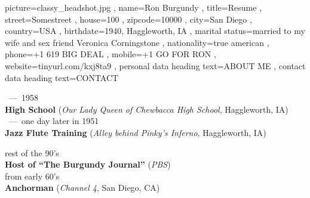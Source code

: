 \documentclass[a4paper, 12pt]{classycv}
\begin{document}
\begin{Resume}{%
	picture={classy_headshot.jpg}%
	, name={Ron Burgundy}%
	, title={Resume}%
	, street=Somestreet%
	, house=100%
	, zipcode=10000%
	, city=San Diego%
	, country=USA%
	, birthdate={1940, Haggleworth, IA}%
	, marital status={married to my wife and sex friend Veronica Corningstone}%
	, nationality=true american%
	, phone=+1 619 BIG DEAL%
	, mobile=+1 GO FOR RON%
	, website=tiny\-url.\-com/\-kxj8ta9%
	, personal data heading text={\MakeUppercase{About Me}}
	, contact data heading text={\MakeUppercase{Contact}}
}
%
%
\bgroup%
\begin{stackbox}[l][t]%
	\textcolor{accent-background}{~---~1958}%
	\\\textbf{High School} (\textit{Our Lady Queen of Chewbacca High School}, Haggleworth, IA)%
	\\\bigskip%
	\textcolor{accent-background}{~---~one day later in 1951}%
	\\\textbf{Jazz Flute Training} (\textit{Alley behind Pinky's Inferno}, Haggleworth, IA)%
\end{stackbox}
\egroup%
%
%
\bgroup%
\robotofamily\normalsize{}\selectfont%
\begin{stackbox}[l][t]%
	\textcolor{accent-background}{\mdseries rest of the 90's}
	\\\textbf{Host of ``The Burgundy Journal''} (\textit{PBS})%
	\\\bigskip
	\textcolor{accent-background}{\mdseries from early 60's}
	\\\textbf{Anchorman} (\textit{Channel 4}, San Diego, CA)%
	\\\bigskip

\end{stackbox}
\end{Resume}
\end{document}
